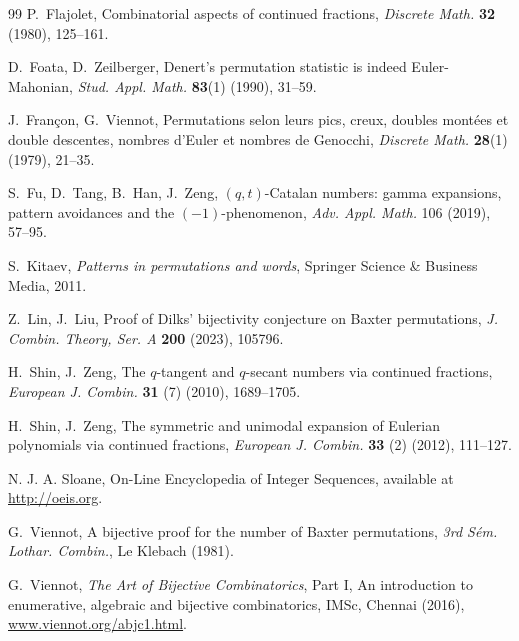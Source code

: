 \documentclass[12pt,reqno]{amsart}
\numberwithin{equation}{section}
\theoremstyle{plain}
\theoremstyle{definition}
\begin{document}
\begin{thebibliography}{99}
P.~Flajolet, Combinatorial aspects of continued fractions, {\it Discrete Math.} {\bf32} (1980), 125--161.

D.~Foata, D.~Zeilberger, Denert's permutation statistic is indeed Euler-Mahonian, {\it Stud. Appl. Math.} {\bf83}(1) (1990), 31--59.

J.~Fran\c con, G.~Viennot, Permutations selon leurs pics, creux, doubles mont\'ees et double descentes, nombres d'Euler et nombres de Genocchi, {\it Discrete Math.} {\bf28}(1) (1979), 21--35.

S.~Fu, D.~Tang, B.~Han, J.~Zeng, $(q,t)$-Catalan numbers: gamma expansions, pattern avoidances and the $(-1)$-phenomenon, {\it Adv. Appl. Math.} 106 (2019), 57--95.

S.~Kitaev, \emph{Patterns in permutations and words}, Springer Science \& Business Media, 2011.

Z.~Lin, J.~Liu, Proof of Dilks' bijectivity conjecture on Baxter permutations, {\it J. Combin. Theory, Ser. A} {\bf200} (2023), 105796.









H.~Shin, J.~Zeng, The $q$-tangent and $q$-secant numbers via continued fractions, \textit{European J. Combin.} {\bf 31} (7) (2010), 1689--1705.

H.~Shin, J.~Zeng, The symmetric and unimodal expansion of Eulerian polynomials via continued fractions, \textit{European J. Combin.} {\bf 33} (2) (2012), 111--127.

N. J. A. Sloane, On-Line Encyclopedia of Integer Sequences, available at \url{http://oeis.org}.

G.~Viennot, A bijective proof for the number of Baxter permutations, {\it 3rd S\'{e}m. Lothar. Combin.}, Le Klebach (1981).

G.~Viennot, {\it The Art of Bijective Combinatorics}, Part I, An introduction to enumerative, algebraic and bijective combinatorics, IMSc, Chennai (2016), \href{https://www.viennot.org/abjc1.html}{www.viennot.org/abjc1.html}.




\end{thebibliography}
\end{document}
